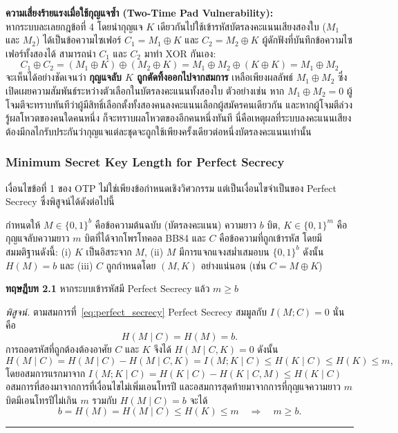 \noindent \textbf{ความเสี่ยงร้ายแรงเมื่อใช้กุญแจซ้ำ (Two-Time Pad Vulnerability):}\\
หากระบบละเลยกฎข้อที่ 4 โดยนำกุญแจ $K$ เดียวกันไปใช้เข้ารหัสบัตรลงคะแนนเสียงสองใบ ($M_1$ และ $M_2$) ได้เป็นข้อความไซเฟอร์ $C_1 = M_1 \oplus K$ และ $C_2 = M_2 \oplus K$ ผู้ดักฟังที่บันทึกข้อความไซเฟอร์ทั้งสองได้ สามารถนำ $C_1$ และ $C_2$ มาทำ XOR กันเอง:
\begin{equation}
    C_1 \oplus C_2 = (M_1 \oplus K) \oplus (M_2 \oplus K) = M_1 \oplus M_2 \oplus (K \oplus K) = M_1 \oplus M_2
\end{equation}
จะเห็นได้อย่างชัดเจนว่า \textbf{กุญแจลับ $K$ ถูกตัดทิ้งออกไปจากสมการ} เหลือเพียงผลลัพธ์ $M_1 \oplus M_2$ ซึ่งเปิดเผยความสัมพันธ์ระหว่างตัวเลือกในบัตรลงคะแนนทั้งสองใบ ตัวอย่างเช่น หาก $M_1 \oplus M_2 = 0$ ผู้โจมตีจะทราบทันทีว่าผู้มีสิทธิ์เลือกตั้งทั้งสองคนลงคะแนนเลือกผู้สมัครคนเดียวกัน และหากผู้โจมตีล่วงรู้ผลโหวตของคนใดคนหนึ่ง ก็จะทราบผลโหวตของอีกคนหนึ่งทันที นี่คือเหตุผลที่ระบบลงคะแนนเสียงต้องมีกลไกรับประกันว่ากุญแจแต่ละชุดจะถูกใช้เพียงครั้งเดียวต่อหนึ่งบัตรลงคะแนนเท่านั้น

\subsubsection{Minimum Secret Key Length for Perfect Secrecy}
\label{sec:key_length_proof}
เงื่อนไขข้อที่ 1 ของ OTP ไม่ใช่เพียงข้อกำหนดเชิงวิศวกรรม แต่เป็นเงื่อนไขจำเป็นของ Perfect Secrecy ซึ่งพิสูจน์ได้ดังต่อไปนี้

กำหนดให้ $M \in \{0,1\}^{b}$ คือข้อความต้นฉบับ (บัตรลงคะแนน) ความยาว $b$ บิต, $K \in \{0,1\}^{m}$ คือกุญแจลับความยาว $m$ บิตที่ได้จากโพรโทคอล BB84 และ $C$ คือข้อความที่ถูกเข้ารหัส โดยมีสมมติฐานดังนี้: (i) $K$ เป็นอิสระจาก $M$, (ii) $M$ มีการแจกแจงสม่ำเสมอบน $\{0,1\}^b$ ดังนั้น $H(M)=b$ และ (iii) $C$ ถูกกำหนดโดย $(M,K)$ อย่างแน่นอน (เช่น $C = M \oplus K$)

\medskip
\noindent \textbf{ทฤษฎีบท 2.1} \quad หากระบบเข้ารหัสมี Perfect Secrecy แล้ว $m \ge b$

\medskip
\noindent \textit{พิสูจน์.} ตามสมการที่~\eqref{eq:perfect_secrecy} Perfect Secrecy สมมูลกับ $I(M;C) = 0$ นั่นคือ
\begin{equation}
    H(M \mid C) = H(M) = b .
\end{equation}
การถอดรหัสที่ถูกต้องต้องอาศัย $C$ และ $K$ จึงได้ $H(M \mid C, K) = 0$ ดังนั้น
\begin{equation}
    H(M \mid C) = H(M \mid C) - H(M \mid C, K) = I(M; K \mid C) \le H(K \mid C) \le H(K) \le m,
\end{equation}
โดยอสมการแรกมาจาก $I(M;K\mid C) = H(K\mid C) - H(K\mid C,M) \le H(K\mid C)$ อสมการที่สองมาจากการที่เงื่อนไขไม่เพิ่มเอนโทรปี และอสมการสุดท้ายมาจากการที่กุญแจความยาว $m$ บิตมีเอนโทรปีไม่เกิน $m$ รวมกับ $H(M \mid C) = b$ จะได้
\begin{equation}
    b = H(M) = H(M \mid C) \le H(K) \le m \quad \Longrightarrow \quad \boxed{m \ge b}.
\end{equation}
\hfill\rule{0.6em}{0.6em}

